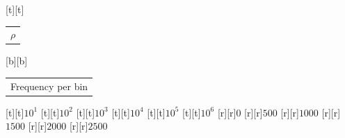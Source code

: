 %    
%
%
\begin{psfrags}%
\psfragscanon%
%
[t][t]{\color[rgb]{0,0,0}\setlength{\tabcolsep}{0pt}\begin{tabular}{c}{\Large$\rho$}\end{tabular}}%
[b][b]{\color[rgb]{0,0,0}\setlength{\tabcolsep}{0pt}\begin{tabular}{c}{\Large Frequency per bin}\end{tabular}}%
%
[t][t]{$10^1$}%
[t][t]{$10^2$}%
[t][t]{$10^3$}%
[t][t]{$10^4$}%
[t][t]{$10^5$}%
[t][t]{$10^6$}%
%
[r][r]{$0$}%
[r][r]{$500$}%
[r][r]{$1000$}%
[r][r]{$1500$}%
[r][r]{$2000$}%
[r][r]{$2500$}%
%
%
\end{psfrags}%
%
